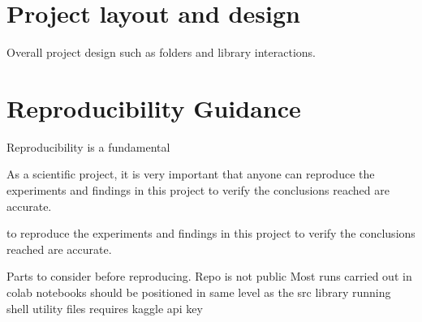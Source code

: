 \section{Project layout and design} \label{sec:projectlayout}
Overall project design such as folders and library interactions.


\section{Reproducibility Guidance} \label{sec:reproducibility}
Reproducibility is a fundamental 

As a scientific project, it is very important that anyone can reproduce the experiments and findings in this project to verify the conclusions reached are accurate. \cite{dataset}


to reproduce the experiments and findings in this project to verify the conclusions reached are accurate.

Parts to consider before reproducing.
Repo is not public
Most runs carried out in colab 
notebooks should be positioned in same level as the src library
running shell utility files requires kaggle api key


\clearpage